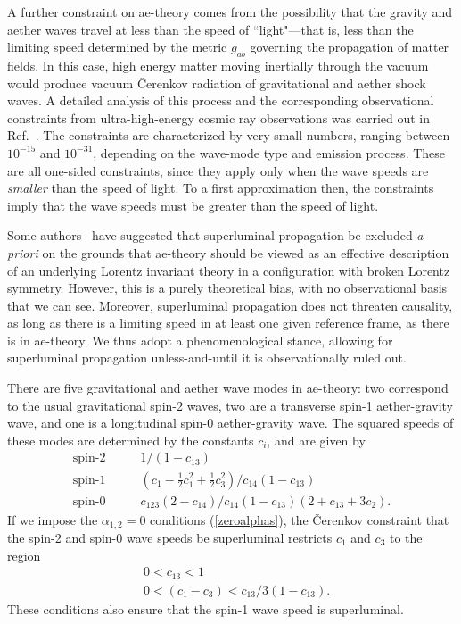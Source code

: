 \documentclass[aps,prd,preprint,amsmath,amssymb]{revtex4}
\def\beq{\begin{equation}}
\def\eeq{\end{equation}}
\def\a{\alpha}
\def\half{\frac{1}{2}}
\begin{document}
A further constraint on ae-theory comes from the possibility that
the gravity and aether waves travel at less than the speed of
``light"---that is, less than the limiting speed determined by the
metric $g_{ab}$ governing the propagation of matter fields. In
this case, high energy matter moving inertially through the vacuum
would produce vacuum \v{C}erenkov radiation of gravitational and
aether shock waves. A detailed analysis of this process and the
corresponding observational constraints from ultra-high-energy
cosmic ray observations was carried out in Ref.~\cite{Elliott:2005va}.
The constraints are characterized by very small numbers, ranging
between $10^{-15}$ and $10^{-31}$, depending on the wave-mode type
and emission process. These are all one-sided constraints, since
they apply only when the wave speeds are {\it smaller} than the
speed of light. To a first approximation then, the constraints
imply that the wave speeds must be greater than the speed of
light.

Some authors~\cite{CLim,Lim,Elliott:2005va}
have suggested that superluminal propagation be
excluded {\it a priori} on the grounds that ae-theory should be
viewed as an effective description of an underlying Lorentz
invariant theory in a configuration with broken Lorentz symmetry.
However, this is a purely theoretical bias, with no observational
basis that we can see. Moreover, superluminal propagation does not
threaten causality, as long as there is a limiting speed in at
least one given reference frame, as there is in ae-theory.  We
thus adopt a phenomenological stance, allowing for superluminal
propagation unless-and-until it is observationally ruled out.

There are five gravitational and aether wave modes in ae-theory:
two correspond to the usual gravitational spin-2 waves, two are a
transverse spin-1 aether-gravity wave, and one is a longitudinal
spin-0 aether-gravity wave. The squared speeds of these modes
are determined by the constants $c_i$, and are given by~\cite{JMwaves}
%
\beq\label{speeds}
\begin{split}
    \mbox{spin-2}\qquad&1/(1-c_{13})\\
    \mbox{spin-1}\qquad&(c_1-\half c_1^2
        +\half c_3^2)/c_{14}(1-c_{13})\\
    \mbox{spin-0}\qquad&c_{123}(2-c_{14})/c_{14}(1-c_{13})(2+c_{13}+3c_2).
\end{split}
\eeq
%
If we impose the $\a_{1,2}=0$ conditions (\ref{zeroalphas}), the
\v{C}erenkov constraint that the spin-2 and spin-0 wave speeds be
superluminal restricts $c_1$ and $c_3$ to the region
%
\beq\label{superluminal}
\begin{split}
    &0<c_{13}<1\\
    &0<(c_1-c_3)< c_{13}/3(1-c_{13}).
\end{split}
\eeq
%
These conditions also ensure that the spin-1 wave speed is
superluminal.
\end{document}

